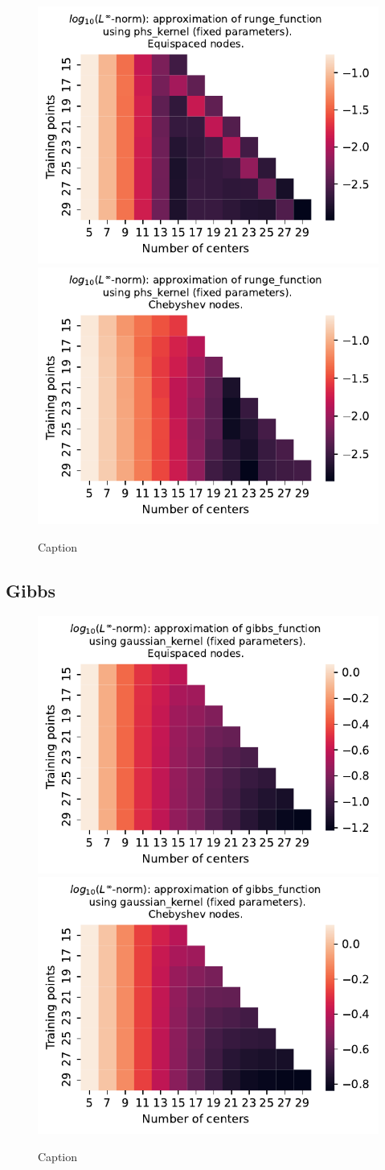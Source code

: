 \documentclass[12pt]{report} %
\begin{document}
\begin{figure}[ht]
  \centering

  \includegraphics[width=.49\textwidth]{imagenes/experiments/1d/least_squares/opt-runge_function-Kphs_kernel-Equi.pdf}
  \includegraphics[width=.49\textwidth]{imagenes/experiments/1d/least_squares/opt-runge_function-Kphs_kernel-Cheb.pdf}
  \caption{Caption}
  \label{fig:opt-runge-phs}
\end{figure}


\subsection*{Gibbs}

\begin{figure}[ht]
  \centering

  \includegraphics[width=.49\textwidth]{imagenes/experiments/1d/least_squares/opt-gibbs_function-Kgaussian_kernel-Equi.pdf}
  \includegraphics[width=.49\textwidth]{imagenes/experiments/1d/least_squares/opt-gibbs_function-Kgaussian_kernel-Cheb.pdf}
  \caption{Caption}
  \label{fig:opt-gibbs-gaussian}
\end{figure}
\end{document}
